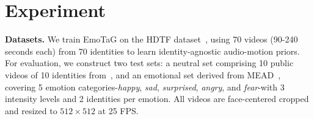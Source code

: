 \begin{table}[t]
\centering
\small
{}
\vspace{-5pt}
\caption{
\textbf{Quantitative comparison on \textit{emotion-intensity}.} We adapt models on Level-2 (medium) and test on Level-1 (weaker) and Level-3 (stronger) separately.
[Key: \textbf{Best}, \underline{Second Best}]}
\vspace{-10pt}
\label{tab:emotion_intensity}
\end{table}


\section{Experiment}

\textbf{Datasets.}
We train EmoTaG on the HDTF dataset~\cite{zhang2021flow}, using 70 videos (90-240 seconds each) from 70 identities to learn identity-agnostic audio-motion priors. For evaluation, we construct two test sets: a neutral set comprising 10 public videos of 10 identities from~\cite{li2023efficient, ye2023geneface}, and an emotional set derived from MEAD~\cite{wang2020mead}, covering 5 emotion categories-\textit{happy}, \textit{sad}, \textit{surprised}, \textit{angry}, and \textit{fear}-with 3 intensity levels and 2 identities per emotion. All videos are face-centered cropped and resized to $512{\times}512$ at 25 FPS.


